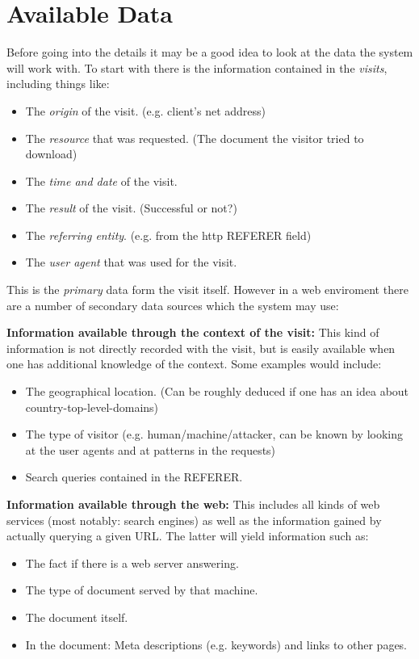 \documentclass[a4paper]{danarticle}
\begin{document}
  \section*{Available Data}
    Before going into the details it may be a good idea to look
    at the data the system will work with. To start with there
    is the information contained in the \textit{visits}, including
    things like:
    \begin{itemize}
    	\item{The \textit{origin} of the visit. (e.g.
    	      client's net address)}
    	\item{The \textit{resource} that was requested. (The document
    	      the visitor tried to download)}
    	\item{The \textit{time and date} of the visit.}
    	\item{The \textit{result} of the visit. (Successful or not?)}
    	\item{The \textit{referring entity}. (e.g. from the http REFERER field)}
    	\item{The \textit{user agent} that was used for the visit.}
    \end{itemize}
    This is the \textit{primary} data form the visit itself. However in
    a web enviroment there are a number of secondary data sources which
    the system may use:
    
    \textbf{Information available through the context of the visit:}
    This kind of information is not directly recorded with the visit,
    but is easily available when one has additional knowledge of the
    context. Some examples would include:
    \begin{itemize}
    	\item{The geographical location. (Can be roughly deduced if 
    	      one has an idea about country-top-level-domains)}
    	\item{The type of visitor (e.g. human/machine/attacker,
    	      can be known by looking at the user agents and
    	      at patterns in the requests)}
    	\item{Search queries contained in the REFERER.}
    \end{itemize}
    
    \textbf{Information available through the web:} This includes
    all kinds of web services (most notably: search engines) as
    well as the information gained by actually querying a given
    URL. The latter will yield information such as:
    \begin{itemize}
    	\item{The fact if there is a web server answering.}
    	\item{The type of document served by that machine.}
    	\item{The document itself.}
    	\item{In the document: Meta descriptions (e.g. keywords)
    	      and links to other pages.}
    \end{itemize}
    
\end{document}
